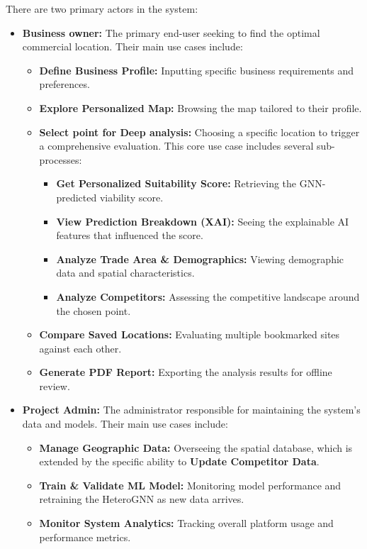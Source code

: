 There are two primary actors in the system:
\begin{itemize}
    \item \textbf{Business owner:} The primary end-user seeking to find the optimal commercial location. Their main use cases include:
    \begin{itemize}
        \item \textbf{Define Business Profile:} Inputting specific business requirements and preferences.
        \item \textbf{Explore Personalized Map:} Browsing the map tailored to their profile.
        \item \textbf{Select point for Deep analysis:} Choosing a specific location to trigger a comprehensive evaluation. This core use case includes several sub-processes:
    \begin{itemize}
			\item \textbf{Get Personalized Suitability Score:} Retrieving the GNN-predicted viability score.
			\item \textbf{View Prediction Breakdown (XAI):} Seeing the explainable AI features that influenced the score.
			\item \textbf{Analyze Trade Area \& Demographics:} Viewing demographic data and spatial characteristics.
			\item \textbf{Analyze Competitors:} Assessing the competitive landscape around the chosen point.
    \end{itemize}
        \item \textbf{Compare Saved Locations:} Evaluating multiple bookmarked sites against each other.
        \item \textbf{Generate PDF Report:} Exporting the analysis results for offline review.
    \end{itemize}

    \item \textbf{Project Admin:} The administrator responsible for maintaining the system's data and models. Their main use cases include:
    \begin{itemize}
        \item \textbf{Manage Geographic Data:} Overseeing the spatial database, which is extended by the specific ability to \textbf{Update Competitor Data}.

        \item \textbf{Train \& Validate ML Model:} Monitoring model performance and retraining the HeteroGNN as new data arrives.
        \item \textbf{Monitor System Analytics:} Tracking overall platform usage and performance metrics.
    \end{itemize}
\end{itemize}
